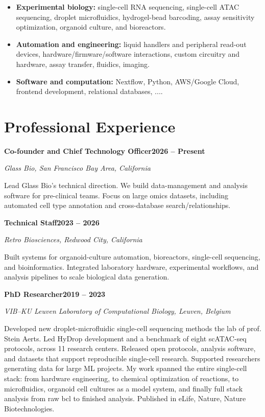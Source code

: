 \documentclass[10pt]{scrartcl}
\newcommand{\cventry}[4]{%
    \needspace{5\baselineskip}%
    {\large\textbf{#1}}\hfill\textbf{#3}\par
    \textit{#2}\par
    \smallskip
    #4\par
    \medskip
}
\begin{document}
\begin{itemize}
    \item \textbf{Experimental biology:} single-cell RNA sequencing, single-cell ATAC sequencing, droplet microfluidics, hydrogel-bead barcoding, assay sensitivity optimization, organoid culture, and bioreactors.
    \item \textbf{Automation and engineering:} liquid handlers and peripheral read-out devices, hardware/firmware/software interactions, custom circuitry and hardware, assay transfer, fluidics, imaging.
    \item \textbf{Software and computation:} Nextflow, Python, AWS/Google Cloud, frontend development, relational databases, ....
\end{itemize}

\section{Professional Experience}

\cventry
    {Co-founder and Chief Technology Officer}
    {Glass Bio, San Francisco Bay Area, California}
    {2026 -- Present}
    {Lead Glass Bio's technical direction. We build data-management and analysis software for pre-clinical teams. Focus on large omics datasets, including automated cell type annotation and cross-database search/relationships.}

\cventry
    {Technical Staff}
    {Retro Biosciences, Redwood City, California}
    {2023 -- 2026}
    {Built systems for organoid-culture automation, bioreactors, single-cell sequencing, and bioinformatics. Integrated laboratory hardware, experimental workflows, and analysis pipelines to scale biological data generation.}

\cventry
    {PhD Researcher}
    {VIB--KU Leuven Laboratory of Computational Biology, Leuven, Belgium}
    {2019 -- 2023}
    {Developed new droplet-microfluidic single-cell sequencing methods the lab of prof. Stein Aerts. Led HyDrop development and a benchmark of eight scATAC-seq protocols, across 11 research centers. Released open protocols, analysis software, and datasets that support reproducible single-cell research. Supported researchers generating data for large ML projects. My work spanned the entire single-cell stack: from hardware engineering, to chemical optimization of reactions, to microfluidics, organoid cell cultures as a model system, and finally full stack analysis from raw bcl to finished analysis. Published in eLife, Nature, Nature Biotechnologies.}
\end{document}
